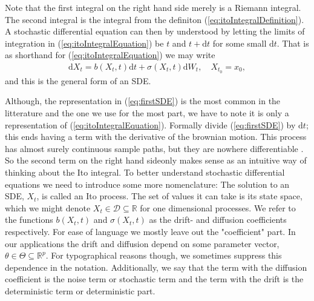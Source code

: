 Note that the first integral on the right hand side merely is a Riemann integral. The second integral is the integral from the definiton (\ref{eq:itoIntegralDefinition}). A stochastic differential equation can then by understood by letting the limits of integration in (\ref{eq:itoIntegralEquation}) be $t$ and $t+\mathrm{d}t$ for some small $\mathrm{d}t$. That is as shorthand for (\ref{eq:itoIntegralEquation}) we may write
\begin{align}
    \mathrm{d}X_t = b(X_t, t)\mathrm{d}t + \sigma(X_t, t)\mathrm{d}W_t, \quad X_{t_0} = x_0 \label{eq:firstSDE},
\end{align}
and this is the general form of an SDE. 

Although, the representation in (\ref{eq:firstSDE}) is the most common in the litterature and the one we use for the most part, we have to note it is only a representation of (\ref{eq:itoIntegralEquation}). Formally divide (\ref{eq:firstSDE}) by $\mathrm{d}t$; this ends having a term with the derivative of the brownian motion. This process has almost surely continuous sample paths, but they are nowhere differentiable \cite[theorem 11.22 and theorem 11.35]{Hansen2022}. So the second term on the right hand sideonly makes sense as an intuitive way of thinking about the Ito integral. 
To better understand stochastic differential equations we need to introduce some more nomenclature: The solution to an SDE, $X_t$, is called an Ito process. The set of values it can take is its state space, which we might denote $X_t\in\mathcal{D}\subseteq\mathbb{R}$ for one dimensional processes. We refer to the functions $b(X_t, t)$ and $\sigma(X_t, t)$ as the drift- and diffusion coefficients respectively. For ease of language we mostly leave out the "coefficient" part. In our applications the drift and diffusion depend on some parameter vector, $\theta\in\Theta\subseteq\mathbb{R}^p$. For typographical reasons though, we sometimes suppress this dependence in the notation. Additionally, we say that the term with the diffusion coefficient is the noise term or stochastic term and the term with the drift is the deterministic term or deterministic part. 

